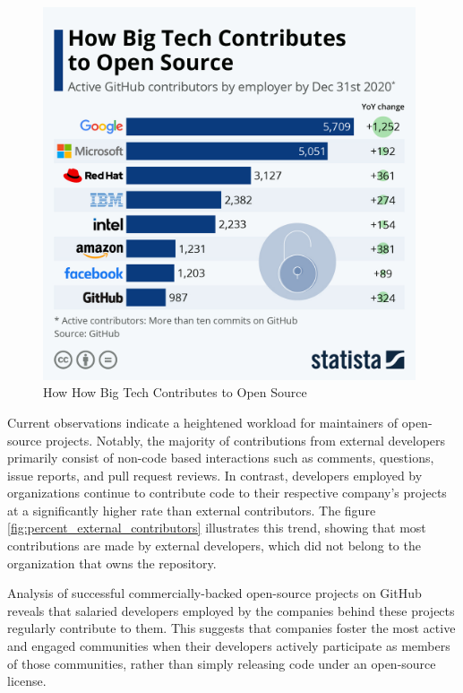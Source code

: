 \begin{figure}[ht]
    \includegraphics[width=11cm]{figs/bigtechcontributes.jpeg}
    \centering
    \caption{How How Big Tech Contributes to Open Source \citep{statista2021bigtechopensource}}
    \label{fig:bigtechcontributes}
\end{figure}


Current observations indicate a heightened workload for maintainers of open-source projects. Notably, the majority of contributions from external developers primarily consist of non-code based interactions such as comments, questions, issue reports, and pull request reviews. In contrast, developers employed by organizations continue to contribute code to their respective company's projects at a significantly higher rate than external contributors. The figure \ref{fig:percent_external_contributors} illustrates this trend, showing that most contributions are made by external developers, which did not belong to the organization that owns the repository.

Analysis of successful commercially-backed open-source projects on GitHub reveals that salaried developers employed by the companies behind these projects regularly contribute to them. This suggests that companies foster the most active and engaged communities when their developers actively participate as members of those communities, rather than simply releasing code under an open-source license.

